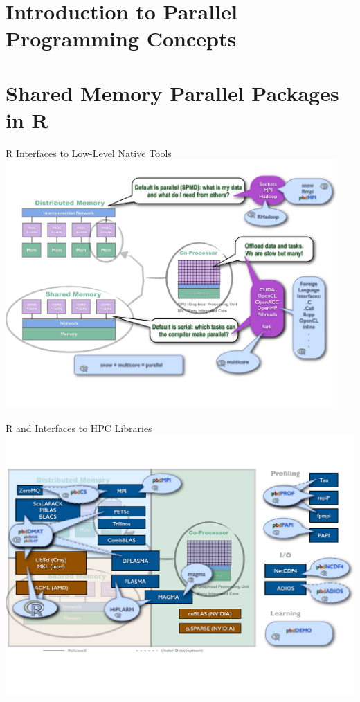 \section{Introduction to Parallel Programming Concepts}
\makesubcontentsslides



\section{Shared Memory Parallel Packages in R}
\makesubcontentsslides

\begin{frame}{R Interfaces to Low-Level Native Tools}
\includegraphics[width=0.95\textwidth]
{../common/pics/hardware/ParallelHardware10.pdf}
\end{frame}

\begin{frame}{R and \pbdR Interfaces to HPC Libraries}
\includegraphics[height=\textheight]
{../common/pics/hardware/ParallelHardware26.pdf}
\end{frame}

